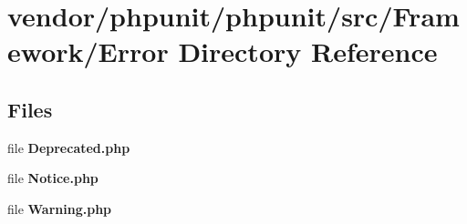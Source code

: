 \section{vendor/phpunit/phpunit/src/\+Framework/\+Error Directory Reference}
\label{dir_ce30c3fb0679c1ccb5c357b3ff1ecfe2}
\subsection*{Files}
\begin{DoxyCompactItemize}
\item 
file {\bf Deprecated.\+php}
\item 
file {\bf Notice.\+php}
\item 
file {\bf Warning.\+php}
\end{DoxyCompactItemize}
